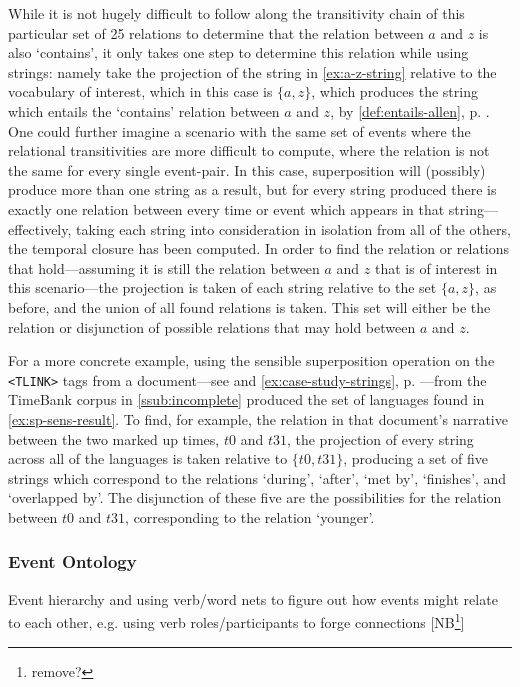 \documentclass[a4paper,12pt,leqno]{article}
\newcommand{\vph}[1]{\vphantom{#1}}
\newcommand{\ebox}[1]{\fbox{$\vph{'(),}#1$}}
\newcommand{\EventString}[1]{%
	\renewcommand*{\do}[1]{\ebox{##1}}%
	\PipeParser{#1}%
}
\newcommand{\nb}[1]{{\color{red}[NB\footnote{{\color{red}#1}}]}}
\begin{document}
While it is not hugely difficult to follow along the transitivity chain of this particular set of 25 relations to determine that the relation between $a$ and $z$ is also `contains', it only takes one step to determine this relation while using strings: namely take the projection of the string in \cref{ex:a-z-string} relative to the vocabulary of interest, which in this case is $\{a,z\}$, which produces the string \EventString{{}|a|a,z|a|{}} which entails the `contains' relation between $a$ and $z$, by \cref{def:entails-allen}, p. \pageref{def:entails-allen}. One could further imagine a scenario with the same set of events where the relational transitivities are more difficult to compute, where the relation is not the same for every single event-pair. In this case, superposition will (possibly) produce more than one string as a result, but for every string produced there is exactly one relation between every time or event which appears in that string---effectively, taking each string into consideration in isolation from all of the others, the temporal closure has been computed. In order to find the relation or relations that hold---assuming it is still the relation between $a$ and $z$ that is of interest in this scenario---the projection is taken of each string relative to the set $\{a,z\}$, as before, and the union of all found relations is taken. This set will either be the relation or disjunction of possible relations that may hold between $a$ and $z$.

For a more concrete example, using the sensible superposition operation on the \allowbreak{}\verb|<TLINK>| tags from a document---see  and \cref{ex:case-study-strings}, p. \pageref{ex:case-study-strings}---from the TimeBank corpus in \cref{ssub:incomplete} produced the set of languages found in \cref{ex:sp-sens-result}. To find, for example, the relation in that document's narrative between the two marked up times, $t0$ and $t31$, the projection of every string across all of the languages is taken relative to $\{t0, t31\}$, producing a set of five strings which correspond to the relations `during', `after', `met by', `finishes', and `overlapped by'. The disjunction of these five are the possibilities for the relation between $t0$ and $t31$, corresponding to the \citet{Freksa1992} relation `younger'.


\subsubsection{Event Ontology}\label{ssub:ontology}
Event hierarchy and using verb/word nets to figure out how events might relate to each other, e.g. using verb roles/participants to forge connections
\nb{remove?}
\end{document}
